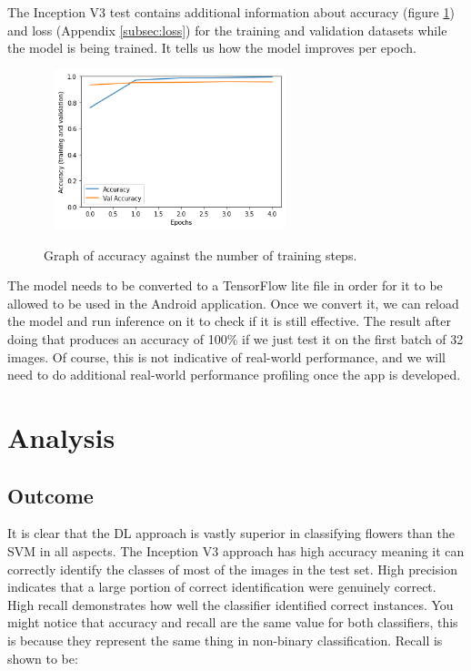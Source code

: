 \documentclass[12pt,a4paper]{report}
\begin{document}
\par

The Inception V3 test contains additional information about accuracy (figure \ref{fig:incep_acc}) and loss 
(Appendix \ref{subsec:loss}) for the training and validation datasets 
while the model is being trained. It tells us how the model improves per epoch.

\begin{figure}[h]\
    \centering
    \includegraphics[width=0.6\textwidth]{Accuracy.png}
    \caption{Graph of accuracy against the number of training steps.}
    \label{fig:incep_acc}
\end{figure}

The model needs to be converted to a TensorFlow lite file in order for it to be allowed to be used in the Android 
application. Once we convert it, we can reload the model and run inference on it to check if it is still effective. The 
result after doing that produces an accuracy of 100\% if we just test it on the first batch of 32 images. Of course, 
this is not indicative of real-world performance, and we will need to do additional real-world performance profiling 
once the app is developed. 

\section{Analysis}

\subsection{Outcome}

It is clear that the DL approach is vastly superior in classifying flowers than the SVM in all aspects. The Inception V3
approach has high accuracy meaning it can correctly identify the classes of most of the images in the test set. 
High precision indicates that a large portion of correct identification were genuinely correct. High recall demonstrates
how well the classifier identified correct instances. You might notice that accuracy and recall are the same value for 
both classifiers, this is because they represent the same thing in non-binary classification. Recall is shown to be:
\end{document}

